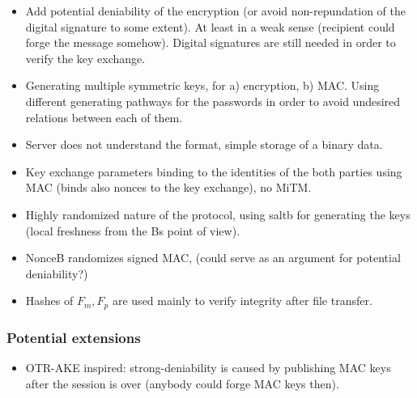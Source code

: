 \documentclass[a4paper,10pt]{article}
\begin{document}
\begin{itemize}
 \item Add potential deniability of the encryption (or avoid non-repundation of the digital signature to some extent). 
	At least in a weak sense (recipient could forge the message somehow). Digital signatures are still needed in order 
	to verify the key exchange.
 \item Generating multiple symmetric keys, for a) encryption, b) MAC. Using different generating pathways for 
	the passwords in order to avoid undesired relations between each of them.
 \item Server does not understand the format, simple storage of a binary data. 
 \item Key exchange parameters binding to the identities of the both parties using MAC (binds also nonces to the key exchange), no MiTM. 
 \item Highly randomized nature of the protocol, using saltb for generating the keys (local freshness from the Bs point of view).
 \item NonceB randomizes signed MAC, (could serve as an argument for potential deniability?)
 \item Hashes of $F_m, F_p$ are used mainly to verify integrity after file transfer.
\end{itemize}

\subsubsection{Potential extensions}
\begin{itemize}
 \item OTR-AKE inspired: strong-deniability is caused by publishing MAC keys after the session is over (anybody could forge MAC keys then).
\end{itemize}
\end{document}

